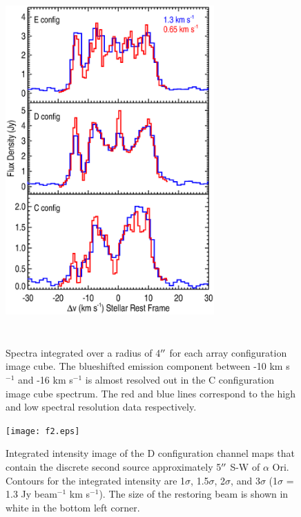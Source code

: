 \documentclass[preprint2]{aastex}
\begin{document}
\clearpage
\begin{figure}
\includegraphics[trim=80pt 60pt 10pt 50pt, clip, width=8.0cm, height=14.0cm]{f1.eps}
\caption{Spectra integrated over a radius of 4$\mbox{$^{\prime\prime}$}$ for each array configuration image cube. The blueshifted emission component between -10 km s${}^{-1}$ and -16 km s${}^{-1}$ is almost resolved out in the C configuration image cube spectrum. The red and blue lines correspond to the high and low spectral resolution data respectively.\label{fig1}}
\label{fig:fig1}
\end{figure}

\clearpage

\begin{figure}
\texttt{[image: f2.eps]}
\caption{Integrated intensity image of the D configuration channel maps that contain the discrete second source approximately 5$\mbox{$^{\prime\prime}$}$ S-W of $\alpha$ Ori. Contours for the integrated intensity are 1$\sigma$, 1.5$\sigma$, 2$\sigma$, and 3$\sigma$ (1$\sigma$ = 1.3 Jy beam${}^{-1}$ km s${}^{-1}$). The size of the restoring beam is shown in white in the bottom left corner.}
\label{fig:fig2}
\end{figure}

\clearpage
\end{document}
